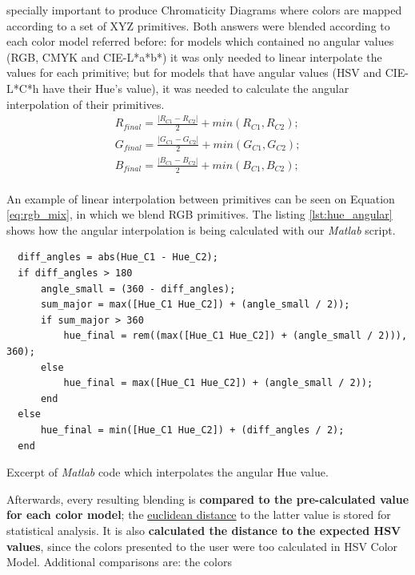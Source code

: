specially important to produce Chromaticity Diagrams where colors are mapped according to a set of XYZ primitives. Both answers were blended according to each color model referred before:
for models which contained no angular values (RGB, CMYK and CIE-L*a*b*) it was only needed to linear interpolate the values for each primitive; but for models that have angular values (HSV and CIE-L*C*h have their Hue's value), it was
needed to calculate the angular interpolation of their primitives.
%
\small
\begin{equation}
  \label{eq:rgb_mix}
  \begin{aligned}
    R_{final} = \frac{|R_{C1} - R_{C2}|}{2} + min(R_{C1}, R_{C2}); \\
    G_{final} = \frac{|G_{C1} - G_{C2}|}{2} + min(G_{C1}, G_{C2}); \\
    B_{final} = \frac{|B_{C1} - B_{C2}|}{2} + min(B_{C1}, B_{C2}); \\
  \end{aligned}
\end{equation} \par
\normalsize
%
An example of linear interpolation between primitives can be seen on Equation \ref{eq:rgb_mix}, in which we blend \gls{RGB} primitives. The listing \ref{lst:hue_angular} shows
how the angular interpolation is being calculated with our \emph{Matlab} script.
%
\begin{listing}[htbp]
  \setlength{\belowcaptionskip}{5pt plus 2pt minus 2pt}
  \begin{verbatim}
  diff_angles = abs(Hue_C1 - Hue_C2);
  if diff_angles > 180
      angle_small = (360 - diff_angles);
      sum_major = max([Hue_C1 Hue_C2]) + (angle_small / 2));
      if sum_major > 360
          hue_final = rem((max([Hue_C1 Hue_C2]) + (angle_small / 2))), 360);
      else
          hue_final = max([Hue_C1 Hue_C2]) + (angle_small / 2));
      end
  else
      hue_final = min([Hue_C1 Hue_C2]) + (diff_angles / 2);
  end
  \end{verbatim}
  \caption{Excerpt of \emph{Matlab} code which interpolates the angular Hue value.}
  \vspace{-15pt}
  \label{lst:hue_angular}
\end{listing}
%
Afterwards, every resulting blending is \textbf{compared to the pre-calculated value for each color model}; the \ul{euclidean distance} to the latter value is stored for statistical analysis. It is
also \textbf{calculated the distance to the expected HSV values}, since the colors presented to the user were too calculated in HSV Color Model. Additional comparisons are: the colors

